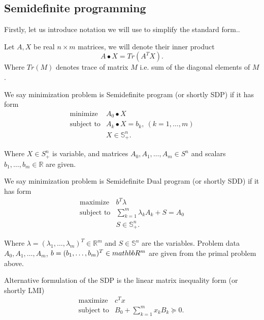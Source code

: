 \documentclass[10pt,oneside]{book}
\theoremstyle{definition}
\begin{document}


\subsection{Semidefinite programming}


Firstly, let us introduce notation we will use to simplify the standard form..

 Let $A,X$ be real $n\times m$ matrices, we will denote their inner product 
$$A\bullet X = Tr(A^TX).$$
Where $Tr(M)$ denotes trace of matrix $M$ i.e. sum of the diagonal elements of $M$.

\label{defSDP}
We say minimization problem is Semidefinite program (or shortly SDP) if it has form
\begin{equation}
\label{sdp} 
\begin{array}{ll}
\mbox{minimize} & A_0\bullet X \\
\mbox{subject to}& A_k\bullet X  = b_k, \ (k = 1,\dots ,m) \\
& X \in \mathbb{S}^n_+.
\end{array} \tag{SDP}
\end{equation}

Where $X\in S^n_+$ is variable, and matrices $A_0 , A_1,\dots , A_m \in S^n$ and scalars $b_1,\dots, b_m \in \mathbb{R}$ are given.



We say minimization problem is Semidefinite Dual program (or shortly SDD) if it has form
\begin{equation}
\label{sdd} 
\begin{array}{ll}
\mbox{maximize} & b^T\lambda \\
\mbox{subject to}& \sum_{k=1}^m \lambda_kA_k + S  = A_0 \\
& S \in \mathbb{S}^n_+.
\end{array} \tag{SDD}
\end{equation}


Where $\lambda = (\lambda_1,\dots ,\lambda_m)^T\in \mathbb{R}^m$ and $S\in \mathbb{S}^n$ are the variables. Problem data $A_0,A_1,\dots ,A_m$, $b = (b_1,\dots ,b_m)^T\in \-mathbb{R}^m$ are given from the primal problem above.


Alternative formulation of the SDP is the linear matrix inequality form (or shortly LMI)
\begin{equation}
\label{lmi} 
\begin{array}{ll}
\mbox{maximize} & c^Tx \\
\mbox{subject to}& B_0 + \sum_{k=1}^m x_kB_k  \succeq 0. \ 
\end{array} \tag{LMI}
\end{equation}
\end{document}
